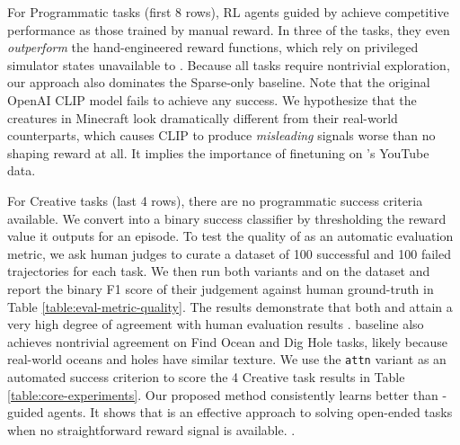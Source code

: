 For Programmatic tasks (first 8 rows), RL agents guided by \mineclip achieve competitive performance as those trained by manual reward. In three of the tasks, they even \textit{outperform} the hand-engineered reward functions, which rely on privileged simulator states unavailable to \mineclip. 
Because all tasks require nontrivial exploration, our approach also dominates the Sparse-only baseline. Note that the original OpenAI CLIP model fails to achieve any success. We hypothesize that the creatures in Minecraft look dramatically different from their real-world counterparts, which causes CLIP to produce \textit{misleading} signals worse than no shaping reward at all. It implies the importance of finetuning on \minedojo's YouTube data. 




For Creative tasks (last 4 rows), there are no programmatic success criteria available. We convert \mineclip into a binary success classifier by thresholding the reward value it outputs for an episode.  
To test the quality of \mineclip as an automatic evaluation metric, we ask human judges to curate a dataset of 100 successful and 100 failed trajectories for each task. 
We then run both \mineclip variants and \openaiclip on the dataset and report the binary F1 score of their judgement against human ground-truth in Table \ref{table:eval-metric-quality}. 
The results demonstrate that both \mineclipattn and \mineclipavg attain a very high degree of agreement with human evaluation results . \openaiclip baseline also achieves nontrivial agreement on Find Ocean and Dig Hole tasks, likely because real-world oceans and holes have similar texture. We use the \texttt{attn} variant as an automated success criterion to score the 4 Creative task results in Table \ref{table:core-experiments}. Our proposed method consistently learns better than \openaiclip-guided agents. It shows that \mineclip is an effective approach to solving open-ended tasks when no straightforward reward signal is available. .


